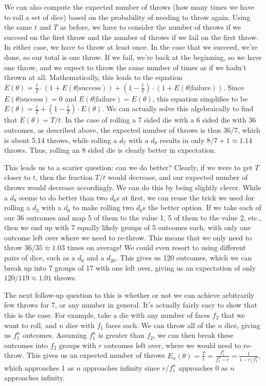 \documentclass{article}
\begin{document}
\par We can also compute the expected number of throws (how many times we have to roll a set of dice) based on the probability of needing to throw again.
Using the same $t$ and $T$ as before, we have to consider the number of throws if we succeed on the first throw and the number of throws if we fail on the first throw.
In either case, we have to throw at least once. 
In the case that we succeed, we're done, so our total is one throw.
If we fail, we're back at the beginning, so we have one throw, and we expect to throw the same number of times as if we hadn't thrown at all.
Mathematically, this leads to the equation $E(\theta) = \frac{t}{T} \cdot (1 + E(\theta | \text{success})) + \left(1 -\frac{t}{T} \right) \cdot (1 + E(\theta | \text{failure}))$.
Since $E(\theta | \text{success}) = 0$ and $E(\theta | \text{failure}) = E(\theta)$, this equation simplifies to be $E(\theta) = \frac{t}{T} + \left(1 - \frac{t}{T} \right) \cdot E(\theta)$.
We can actually solve this algebraically to find that $E(\theta) = T/t$. 
In the case of rolling a 7 sided die with a 6 sided die with 36 outcomes, as described above, the expected number of throws is thus 36/7, which is about 5.14 throws, while rolling a $d_7$ with a $d_8$ results in only $8/7 + 1 \approx 1.14$ throws.
Thus, rolling an 8 sided die is clearly better in expectation.

\par This leads us to a scarier question: can we do better?
Clearly, if we were to get $T$ closer to $t$, then the fraction $T/t$ would decrease, and our expected number of throws would decrease accordingly. 
We can do this by being slightly clever.
While a $d_8$ seems to do better than two $d_6$s at first, we can reuse the trick we used for rolling a $d_3$ with a $d_6$ to make rolling two $d_6$s the better option.
If we take each of our 36 outcomes and map 5 of them to the value 1, 5 of them to the value 2, etc., then we end up with 7 equally likely groups of 5 outcomes each, with only one outcome left over where we need to re-throw.
This means that we only need to throw $36/35 \approx 1.03$ times on average! 
We could even resort to using different pairs of dice, such as a $d_6$ and a $d_{20}$.
This gives us 120 outcomes, which we can break up into 7 groups of 17 with one left over, giving us an expectation of only $120/119 \approx 1.01$ throws.

\par The next follow-up question to this is whether or not we can achieve arbitrarily few throws for 7, or any number in general. 
It's actually fairly easy to show that this is the case.
For example, take a die with any number of faces $f_2$ that we want to roll, and $n$ dice with $f_1$ faces each.
We can throw all of the $n$ dice, giving us $f_1^n$ outcomes.
Assuming $f_1^n$ is greater than $f_2$, we can then break these outcomes into $f_2$ groups with $r$ outcomes left over, where we would need to re-throw.
This gives us an expected number of throws $E_n(\theta) = \frac{T}{t} = \frac{f_1^n}{f_1^n - r} = \frac{1}{1 - r/f_1^n}$, which approaches 1 as $n$ approaches infinity since $r/f_1^n$ approaches 0 as $n$ approaches infinity.
\end{document}
